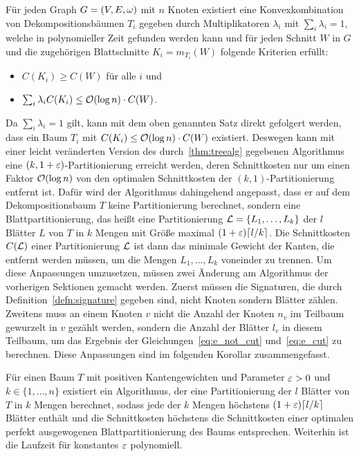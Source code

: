 \begin{thm}\label{thm:decomptrees}
    Für jeden Graph $G=(V, E, \omega)$ mit $n$ Knoten existiert eine Konvexkombination von Dekompositionsbäumen $T_i$ gegeben durch Multiplikatoren $\lambda_i$ mit $\sum_i \lambda_i = 1$, welche in polynomieller Zeit gefunden werden kann und für jeden Schnitt $W$ in $G$ und die zugehörigen Blattschnitte $K_i = m_{T_i}(W)$ folgende Kriterien erfüllt:
    \begin{itemize}
        \item $C(K_i) \geq C(W)$ für alle $i$ und
        \item $\sum_i \lambda_i C(K_i) \leq \mathcal{O}(\log n) \cdot C(W)$.
    \end{itemize}
\end{thm}

Da $\sum_i \lambda_i = 1$ gilt, kann mit dem oben genannten Satz direkt gefolgert werden, dass ein Baum $T_i$ mit $C(K_i) \leq \mathcal{O}(\log n) \cdot C(W)$ existiert.
Deswegen kann mit einer leicht veränderten Version des durch~\ref{thm:treealg} gegebenen Algorithmus eine $(k,1 + \varepsilon)$\hyp Partitionierung erreicht werden, deren Schnittkosten nur um einen Faktor $\mathcal{O}(\log n)$ von den optimalen Schnittkosten der $(k, 1)$\hyp Partitionierung entfernt ist.
Dafür wird der Algorithmus dahingehend angepasst, dass er auf dem Dekompositionsbaum $T$ keine Partitionierung berechnet, sondern eine Blattpartitionierung, das heißt eine Partitionierung $\mathcal{L} = \{L_1, \ldots, L_k\}$ der $l$ Blätter $L$ von $T$ in $k$ Mengen mit Größe maximal $(1 + \eps) \ceil*{l/k}$.
Die Schnittkosten $C(\mathcal{L})$ einer Partitionierung $\mathcal{L}$ ist dann das minimale Gewicht der Kanten, die entfernt werden müssen, um die Mengen $L_1, \ldots, L_k$ voneinder zu trennen.
Um diese Anpassungen umzusetzen, müssen zwei Änderung am Algorithmus der vorherigen Sektionen gemacht werden. 
Zuerst müssen die Signaturen, die durch Definition~\ref{defn:signature} gegeben sind, nicht Knoten sondern Blätter zählen.
Zweitens muss an einem Knoten $v$ nicht die Anzahl der Knoten $n_v$ im Teilbaum gewurzelt in $v$ gezählt werden, sondern die Anzahl der Blätter $l_v$ in diesem Teilbaum, um das Ergebnis der Gleichungen~\eqref{eq:e_not_cut} und~\eqref{eq:e_cut} zu berechnen. 
Diese Anpassungen sind im folgenden Korollar zusammengefasst.

\begin{cor}\label{cor:leafpartitioning}
    Für einen Baum $T$ mit positiven Kantengewichten und Parameter $\varepsilon > 0$ und $k \in \{1, \ldots, n\}$ existiert ein Algorithmus, der eine Partitionierung der $l$ Blätter von $T$ in $k$ Mengen berechnet, sodass jede der $k$ Mengen höchstens $(1 + \eps) \ceil*{l/k}$ Blätter enthält und die Schnittkosten höchstens die Schnittkosten einer optimalen perfekt ausgewogenen Blattpartitionierung des Baums entsprechen. 
        Weiterhin ist die Laufzeit für konstantes $\varepsilon$ polynomiell.
\end{cor}

